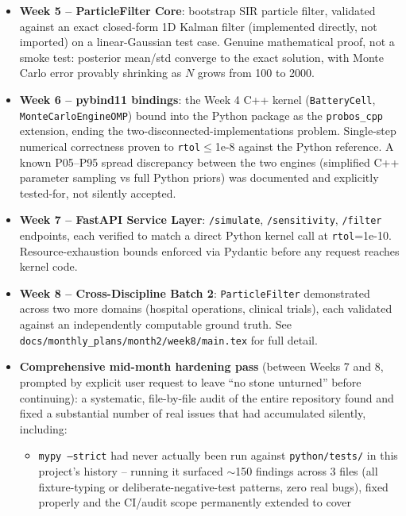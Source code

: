 \documentclass[11pt]{article}
\begin{document}
\begin{itemize}[leftmargin=*]
  \item \textbf{Week 5 -- ParticleFilter Core}: bootstrap SIR particle
    filter, validated against an exact closed-form 1D Kalman filter
    (implemented directly, not imported) on a linear-Gaussian test
    case. Genuine mathematical proof, not a smoke test: posterior
    mean/std converge to the exact solution, with Monte Carlo error
    provably shrinking as $N$ grows from 100 to 2000.
  \item \textbf{Week 6 -- pybind11 bindings}: the Week 4 C++ kernel
    (\texttt{BatteryCell}, \texttt{MonteCarloEngineOMP}) bound into
    the Python package as the \texttt{probos\_cpp} extension, ending
    the two-disconnected-implementations problem. Single-step
    numerical correctness proven to \texttt{rtol}$\le$1e-8 against the
    Python reference. A known P05--P95 spread discrepancy between the
    two engines (simplified C++ parameter sampling vs full Python
    priors) was documented and explicitly tested-for, not silently
    accepted.
  \item \textbf{Week 7 -- FastAPI Service Layer}: \texttt{/simulate},
    \texttt{/sensitivity}, \texttt{/filter} endpoints, each verified
    to match a direct Python kernel call at \texttt{rtol}=1e-10.
    Resource-exhaustion bounds enforced via Pydantic before any
    request reaches kernel code.
  \item \textbf{Week 8 -- Cross-Discipline Batch 2}: \texttt{ParticleFilter}
    demonstrated across two more domains (hospital operations,
    clinical trials), each validated against an independently
    computable ground truth. See
    \texttt{docs/monthly\_plans/month2/week8/main.tex} for full detail.
  \item \textbf{Comprehensive mid-month hardening pass} (between Weeks
    7 and 8, prompted by explicit user request to leave ``no stone
    unturned'' before continuing): a systematic, file-by-file audit
    of the entire repository found and fixed a substantial number of
    real issues that had accumulated silently, including:
    \begin{itemize}
      \item \texttt{mypy --strict} had never actually been run against
        \texttt{python/tests/} in this project's history -- running it
        surfaced $\sim$150 findings across 3 files (all fixture-typing
        or deliberate-negative-test patterns, zero real bugs), fixed
        properly and the CI/audit scope permanently extended to cover

\end{itemize}
\end{itemize}
\end{document}

